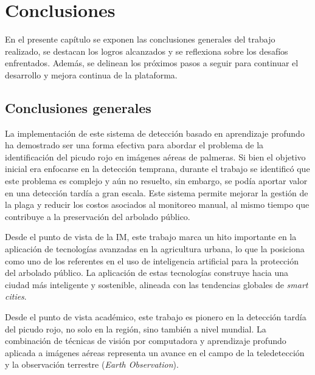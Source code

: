 
\chapter{Conclusiones} %

\label{Chapter5} %
En el presente capítulo se exponen las conclusiones generales del trabajo realizado, se destacan los logros alcanzados y se reflexiona sobre los desafíos enfrentados. Además, se delinean los próximos pasos a seguir para continuar el desarrollo y mejora continua de la plataforma.




\section{Conclusiones generales }

La implementación de este sistema de detección basado en aprendizaje profundo ha demostrado ser una forma efectiva para abordar el problema de la identificación del picudo rojo en imágenes aéreas de palmeras. Si bien el objetivo inicial era enfocarse en la detección temprana, durante el trabajo se identificó que este problema es complejo y aún no resuelto, sin embargo, se podía aportar valor en una detección tardía a gran escala. Este sistema permite mejorar la gestión de la plaga y reducir los costos asociados al monitoreo manual, al mismo tiempo que contribuye a la preservación del arbolado público.

Desde el punto de vista de la IM, este trabajo marca un hito importante en la aplicación de tecnologías avanzadas en la agricultura urbana, lo que la posiciona como uno de los referentes en el uso de inteligencia artificial para la protección del arbolado público. La aplicación de estas tecnologías construye hacia una ciudad más inteligente y sostenible, alineada con las tendencias globales de \textit{smart cities}.

Desde el punto de vista académico, este trabajo es pionero en la detección tardía del picudo rojo, no solo en la región, sino también a nivel mundial. La combinación de técnicas de visión por computadora y aprendizaje profundo aplicada a imágenes aéreas representa un avance en el campo de la teledetección y la observación terrestre (\textit{Earth Observation}).

